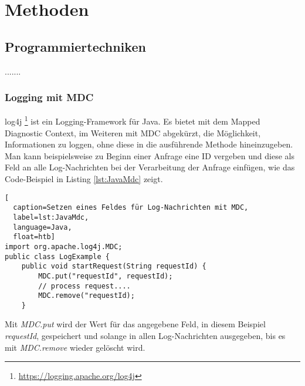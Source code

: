 \section{Methoden}
\label{chapter:methoden}

\subsection{Programmiertechniken}
.......

\subsubsection{Logging mit MDC}
log4j \footnote{\url{https://logging.apache.org/log4j}} ist ein Logging-Framework für Java. Es bietet mit dem Mapped Diagnostic Context, im Weiteren mit MDC abgekürzt, die Möglichkeit, Informationen zu loggen, ohne diese in die ausführende Methode hineinzugeben. Man kann beispielsweise zu Beginn einer Anfrage eine ID vergeben und diese als Feld an alle Log-Nachrichten bei der Verarbeitung der Anfrage einfügen, wie das Code-Beispiel in Listing \ref{lst:JavaMdc} zeigt.

\begin{lstlisting}[
  caption=Setzen eines Feldes für Log-Nachrichten mit MDC,
  label=lst:JavaMdc,
  language=Java,
  float=htb]
import org.apache.log4j.MDC;
public class LogExample {
    public void startRequest(String requestId) {
        MDC.put("requestId", requestId);    
        // process request....
        MDC.remove("requestId);
    }
\end{lstlisting}

Mit \textit{MDC.put} wird der Wert für das angegebene Feld, in diesem Beispiel \mbox{\textit{requestId}}, gespeichert und solange in allen Log-Nachrichten ausgegeben, bis es mit \textit{MDC.remove} wieder gelöscht wird. 
 